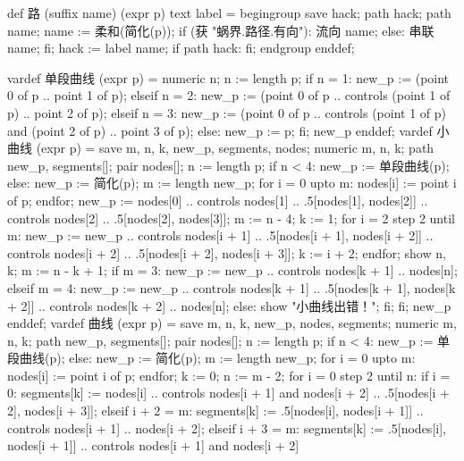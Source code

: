 \startMPinclusions[+]
def 路 (suffix name) (expr p) text label =
  begingroup
  save hack; path hack;
  path name; name := 柔和(简化(p));
  if (获 "蜗界.路径.有向"):
    流向 name;
  else:
    串联 name;
  fi;
  hack := label name;
  if path hack: fi;
  endgroup
enddef;
\stopMPinclusions

\startMPinclusions[+]
vardef 单段曲线 (expr p) =
  numeric n; n := length p;
  if n = 1:
    new_p := (point 0 of p .. point 1 of p);
  elseif n = 2:
    new_p := (point 0 of p .. controls (point 1 of p) .. point 2 of p);
  elseif n = 3:
    new_p := (point 0 of p .. 
        controls (point 1 of p) and (point 2 of p) 
        .. point 3 of p);
  else:
    new_p := p;
  fi;
  new_p
enddef;
vardef 小曲线 (expr p) =
  save m, n, k, new_p, segments, nodes;
  numeric m, n, k; path new_p, segments[]; pair nodes[];
  n := length p;
  if n < 4:
    new_p := 单段曲线(p);
  else:
    new_p := 简化(p);
    m := length new_p;
    for i = 0 upto m:
      nodes[i] := point i of p;
    endfor;
    new_p := nodes[0] 
          .. controls nodes[1]
          .. .5[nodes[1], nodes[2]]
          .. controls nodes[2]
          .. .5[nodes[2], nodes[3]];
    m := n - 4;
    k := 1;
    for i = 2 step 2 until m:
      new_p := new_p
          .. controls nodes[i + 1]
          .. .5[nodes[i + 1], nodes[i + 2]]
          .. controls nodes[i + 2]
          .. .5[nodes[i + 2], nodes[i + 3]];
      k := i + 2;
    endfor;
    show n, k;
    m := n - k + 1;
    if m = 3:
      new_p := new_p .. controls nodes[k + 1] .. nodes[n];
    elseif m = 4:
      new_p := new_p 
        .. controls nodes[k + 1]
        .. .5[nodes[k + 1], nodes[k + 2]]
        .. controls nodes[k + 2]
        .. nodes[n];
    else:
      show "小曲线出错！";
    fi;
  fi;
  new_p
enddef;
vardef 曲线 (expr p) =
  save m, n, k, new_p, nodes, segments;
  numeric m, n, k; path new_p, segments[]; pair nodes[];
  n := length p;
  if n < 4:
    new_p := 单段曲线(p);
  else:
    new_p := 简化(p);
    m := length new_p;
    for i = 0 upto m:
      nodes[i] := point i of p;
    endfor;
    k := 0;
    n := m - 2;
    for i = 0 step 2 until n:
      if i = 0:
        segments[k] := nodes[i] 
          .. controls nodes[i + 1] and nodes[i + 2] 
          .. .5[nodes[i + 2], nodes[i + 3]];
      elseif i + 2 = m:
        segments[k] := .5[nodes[i], nodes[i + 1]] 
          .. controls nodes[i + 1]
          .. nodes[i + 2];
      elseif i + 3 = m:
        segments[k] := .5[nodes[i], nodes[i + 1]] 
          .. controls nodes[i + 1] and nodes[i + 2] 
